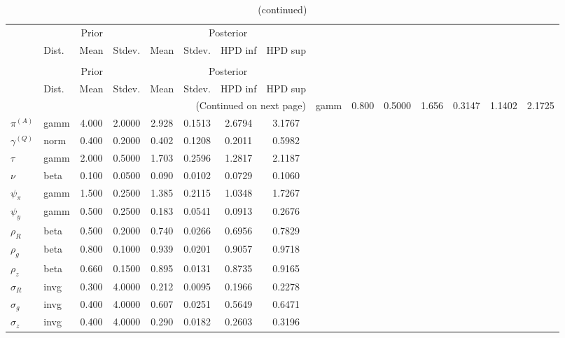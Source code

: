  
\begin{center}
\begin{longtable}{llcccccc} 
\caption{Results from Metropolis-Hastings (parameters)}
 \label{Table:MHPosterior:1}\\
\toprule 
  & \multicolumn{3}{c}{Prior}  &  \multicolumn{4}{c}{Posterior} \\
  \cmidrule(r{.75em}){2-4} \cmidrule(r{.75em}){5-8}
  & Dist. & Mean  & Stdev. & Mean & Stdev. & HPD inf & HPD sup\\
\midrule \endfirsthead 
\caption{(continued)}\\\toprule 
  & \multicolumn{3}{c}{Prior}  &  \multicolumn{4}{c}{Posterior} \\
  \cmidrule(r{.75em}){2-4} \cmidrule(r{.75em}){5-8}
  & Dist. & Mean  & Stdev. & Mean & Stdev. & HPD inf & HPD sup\\
\midrule \endhead 
\bottomrule \multicolumn{8}{r}{(Continued on next page)} \endfoot 
\bottomrule \endlastfoot 
${r_{A}}$ & gamm &   0.800 & 0.5000 &   1.656& 0.3147 &  1.1402 &  2.1725 \\ 
${\pi^{(A)}}$ & gamm &   4.000 & 2.0000 &   2.928& 0.1513 &  2.6794 &  3.1767 \\ 
${\gamma^{(Q)}}$ & norm &   0.400 & 0.2000 &   0.402& 0.1208 &  0.2011 &  0.5982 \\ 
${\tau}$ & gamm &   2.000 & 0.5000 &   1.703& 0.2596 &  1.2817 &  2.1187 \\ 
${\nu}$ & beta &   0.100 & 0.0500 &   0.090& 0.0102 &  0.0729 &  0.1060 \\ 
${\psi_\pi}$ & gamm &   1.500 & 0.2500 &   1.385& 0.2115 &  1.0348 &  1.7267 \\ 
${\psi_y}$ & gamm &   0.500 & 0.2500 &   0.183& 0.0541 &  0.0913 &  0.2676 \\ 
${\rho_R}$ & beta &   0.500 & 0.2000 &   0.740& 0.0266 &  0.6956 &  0.7829 \\ 
${\rho_{g}}$ & beta &   0.800 & 0.1000 &   0.939& 0.0201 &  0.9057 &  0.9718 \\ 
${\rho_z}$ & beta &   0.660 & 0.1500 &   0.895& 0.0131 &  0.8735 &  0.9165 \\ 
${\sigma_R}$ & invg &   0.300 & 4.0000 &   0.212& 0.0095 &  0.1966 &  0.2278 \\ 
${\sigma_{g}}$ & invg &   0.400 & 4.0000 &   0.607& 0.0251 &  0.5649 &  0.6471 \\ 
${\sigma_z}$ & invg &   0.400 & 4.0000 &   0.290& 0.0182 &  0.2603 &  0.3196 \\ 
\end{longtable}
 \end{center}
